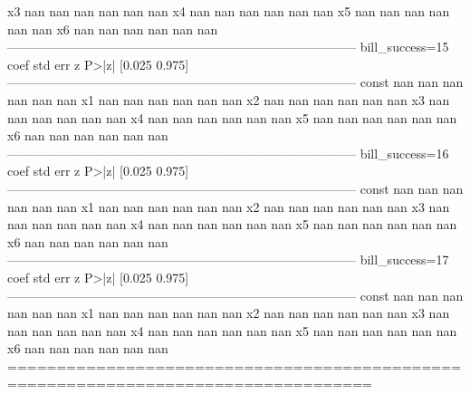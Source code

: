 \begin{pyprint}
x3                     nan        nan        nan        nan         nan         nan
x4                     nan        nan        nan        nan         nan         nan
x5                     nan        nan        nan        nan         nan         nan
x6                     nan        nan        nan        nan         nan         nan
-----------------------------------------------------------------------------------
bill_success=15       coef    std err          z      P>|z|      [0.025      0.975]
-----------------------------------------------------------------------------------
const                  nan        nan        nan        nan         nan         nan
x1                     nan        nan        nan        nan         nan         nan
x2                     nan        nan        nan        nan         nan         nan
x3                     nan        nan        nan        nan         nan         nan
x4                     nan        nan        nan        nan         nan         nan
x5                     nan        nan        nan        nan         nan         nan
x6                     nan        nan        nan        nan         nan         nan
-----------------------------------------------------------------------------------
bill_success=16       coef    std err          z      P>|z|      [0.025      0.975]
-----------------------------------------------------------------------------------
const                  nan        nan        nan        nan         nan         nan
x1                     nan        nan        nan        nan         nan         nan
x2                     nan        nan        nan        nan         nan         nan
x3                     nan        nan        nan        nan         nan         nan
x4                     nan        nan        nan        nan         nan         nan
x5                     nan        nan        nan        nan         nan         nan
x6                     nan        nan        nan        nan         nan         nan
-----------------------------------------------------------------------------------
bill_success=17       coef    std err          z      P>|z|      [0.025      0.975]
-----------------------------------------------------------------------------------
const                  nan        nan        nan        nan         nan         nan
x1                     nan        nan        nan        nan         nan         nan
x2                     nan        nan        nan        nan         nan         nan
x3                     nan        nan        nan        nan         nan         nan
x4                     nan        nan        nan        nan         nan         nan
x5                     nan        nan        nan        nan         nan         nan
x6                     nan        nan        nan        nan         nan         nan
===================================================================================
\end{pyprint}

